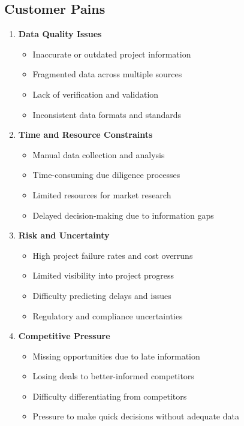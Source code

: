 \documentclass[business]{../templates/infraradar-main}
\begin{document}
\subsection{Customer Pains}
\begin{enumerate}
    \item \textbf{Data Quality Issues}
    \begin{itemize}
        \item Inaccurate or outdated project information
        \item Fragmented data across multiple sources
        \item Lack of verification and validation
        \item Inconsistent data formats and standards
    \end{itemize}
    
    \item \textbf{Time and Resource Constraints}
    \begin{itemize}
        \item Manual data collection and analysis
        \item Time-consuming due diligence processes
        \item Limited resources for market research
        \item Delayed decision-making due to information gaps
    \end{itemize}
    
    \item \textbf{Risk and Uncertainty}
    \begin{itemize}
        \item High project failure rates and cost overruns
        \item Limited visibility into project progress
        \item Difficulty predicting delays and issues
        \item Regulatory and compliance uncertainties
    \end{itemize}
    
    \item \textbf{Competitive Pressure}
    \begin{itemize}
        \item Missing opportunities due to late information
        \item Losing deals to better-informed competitors
        \item Difficulty differentiating from competitors
        \item Pressure to make quick decisions without adequate data
    \end{itemize}
\end{enumerate}
\end{document}
